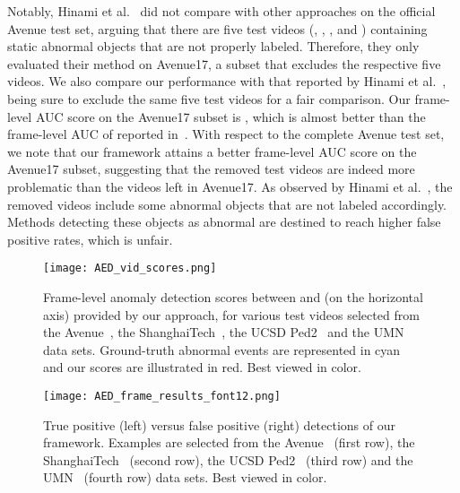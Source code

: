 \documentclass[10pt,twocolumn,letterpaper]{article}
\begin{document}
Notably, Hinami et al.~\cite{Hinami-ICCV-2017} did not compare with other approaches on the official Avenue test set, arguing that there are five test videos (, , ,  and ) containing static abnormal objects that are not properly labeled. Therefore, they only evaluated their method on Avenue17, a subset that excludes the respective five videos. We also compare our performance with that reported by Hinami et al.~\cite{Hinami-ICCV-2017}, being sure to exclude the same five test videos for a fair comparison. Our frame-level AUC score on the Avenue17 subset is , which is almost  better than the frame-level AUC of  reported in~\cite{Hinami-ICCV-2017}. With respect to the complete Avenue test set, we note that our framework attains a better frame-level AUC score on the Avenue17 subset, suggesting that the removed test videos are indeed more problematic than the videos left in Avenue17. As observed by Hinami et al.~\cite{Hinami-ICCV-2017}, the removed videos include some abnormal objects that are not labeled accordingly. Methods detecting these objects as abnormal are destined to reach higher false positive rates, which is unfair.

\begin{figure}[!t]
\begin{center}
\texttt{[image: AED\_vid\_scores.png]}
\end{center}
\vspace*{-0.4cm}
\caption{Frame-level anomaly detection scores between  and  (on the horizontal axis) provided by our approach, for various test videos selected from the Avenue~\cite{Lu-ICCV-2013}, the ShanghaiTech~\cite{Luo-ICCV-2017}, the UCSD Ped2~\cite{Mahadevan-CVPR-2010} and the UMN~\cite{Mehran-CVPR-2009} data sets. Ground-truth abnormal events are represented in cyan and our scores are illustrated in red. Best viewed in color.}
\label{fig_vid_scores}
\vspace*{-0.45cm}
\end{figure}

\begin{figure*}[!t]
\begin{center}
\texttt{[image: AED\_frame\_results\_font12.png]}
\end{center}
\vspace*{-0.4cm}
\caption{True positive (left) versus false positive (right) detections of our framework. Examples are selected from the Avenue~\cite{Lu-ICCV-2013} (first row), the ShanghaiTech~\cite{Luo-ICCV-2017} (second row), the UCSD Ped2~\cite{Mahadevan-CVPR-2010} (third row) and the UMN~\cite{Mehran-CVPR-2009} (fourth row) data sets. Best viewed in color.}
\label{fig_pos_neg}
\vspace*{-0.4cm}
\end{figure*}
\end{document}
